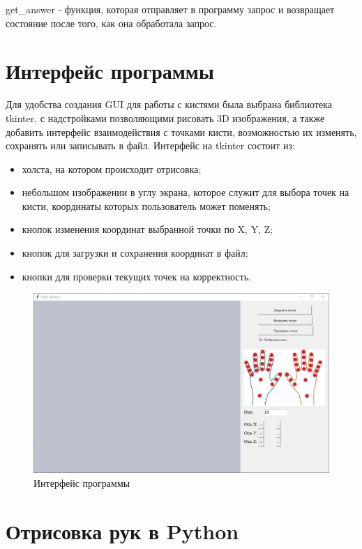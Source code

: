 \hspace{0.6cm} get\_answer - функция, которая отправляет в программу запрос и возвращает состояние после того, как она обработала запрос.

\section{Интерфейс программы}
\hspace{0.6cm} Для удобства создания GUI для работы с кистями была выбрана библиотека tkinter, с надстройками позволяющими рисовать 3D изображения, а также добавить интерфейс взаимодействия с точками кисти, возможностью их изменять, сохранять или записывать в файл.
\hspace{0.6cm} Интерфейс на tkinter состоит из:
\begin{itemize}
	\item холста, на котором происходит отрисовка;
	\item небольшом изображении в углу экрана, которое служит для выбора точек на кисти, координаты которых пользователь может поменять;
	\item кнопок изменения координат выбранной точки по X, Y, Z;
	\item кнопок для загрузки и сохранения координат в файл;
	\item кнопки для проверки текущих точек на корректность.
\end{itemize}

\begin{figure}[ht!]
	\centering
	\includegraphics[scale=0.5]{example_gui.jpg}
	\caption{Интерфейс программы}
	\label{fig:gui}
\end{figure}

\section{Отрисовка рук в Python}

